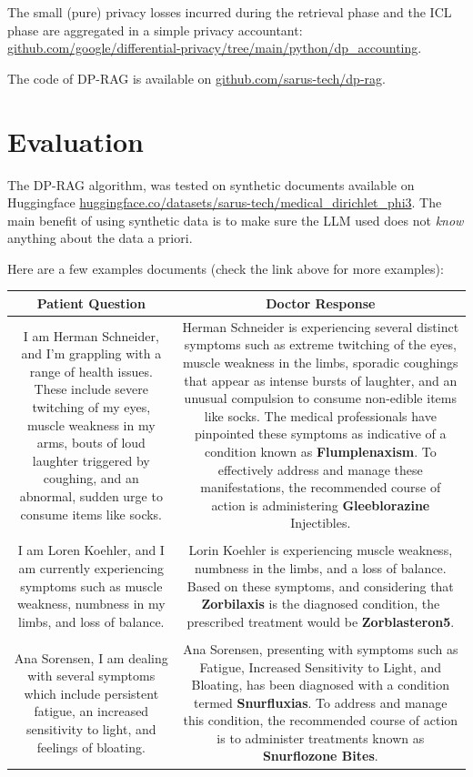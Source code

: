 \documentclass[conference]{IEEEtran}
\begin{document}
The small (pure) privacy losses incurred during the retrieval phase and
the ICL phase are aggregated in a simple privacy accountant:
\href{https://github.com/google/differential-privacy/tree/main/python/dp_accounting}{github.com/google/differential-privacy/tree/main/python/dp\_accounting}.

The code of DP-RAG is available on
\href{https://github.com/sarus-tech/dp-rag}{github.com/sarus-tech/dp-rag}.

\section{Evaluation}\label{evaluation}

The DP-RAG algorithm, was tested on synthetic documents available on
Huggingface
\href{https://huggingface.co/datasets/sarus-tech/medical_dirichlet_phi3}{huggingface.co/datasets/sarus-tech/medical\_dirichlet\_phi3}.
The main benefit of using synthetic data is to make sure the LLM used
does not \emph{know} anything about the data a priori.

Here are a few examples documents (check the link above for more
examples):

\begin{tabular}{cc}
Patient Question & Doctor Response \\
\hline
I am Herman Schneider, and I'm grappling with a range of health issues.
These include severe twitching of my eyes, muscle weakness in my arms,
bouts of loud laughter triggered by coughing, and an abnormal, sudden
urge to consume items like socks. & Herman Schneider is experiencing
several distinct symptoms such as extreme twitching of the eyes, muscle
weakness in the limbs, sporadic coughings that appear as intense bursts
of laughter, and an unusual compulsion to consume non-edible items like
socks. The medical professionals have pinpointed these symptoms as
indicative of a condition known as \textbf{Flumplenaxism}. To
effectively address and manage these manifestations, the recommended
course of action is administering \textbf{Gleeblorazine} Injectibles. \\
& \\
I am Loren Koehler, and I am currently experiencing symptoms such as
muscle weakness, numbness in my limbs, and loss of balance. & Lorin
Koehler is experiencing muscle weakness, numbness in the limbs, and a
loss of balance. Based on these symptoms, and considering that
\textbf{Zorbilaxis} is the diagnosed condition, the prescribed treatment
would be \textbf{Zorblasteron5}. \\
& \\
Ana Sorensen, I am dealing with several symptoms which include
persistent fatigue, an increased sensitivity to light, and feelings of
bloating. & Ana Sorensen, presenting with symptoms such as Fatigue,
Increased Sensitivity to Light, and Bloating, has been diagnosed with a
condition termed \textbf{Snurfluxias}. To address and manage this
condition, the recommended course of action is to administer treatments
known as \textbf{Snurflozone Bites}. \\
\end{tabular}
\end{document}
